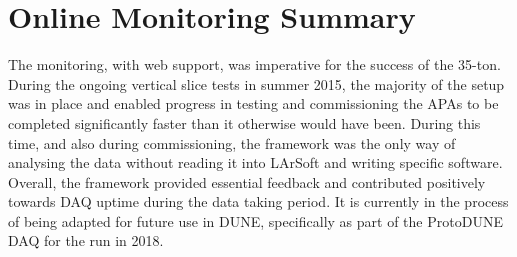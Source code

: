 \section{Online Monitoring Summary}

The monitoring, with web support, was imperative for the success of the 35-ton.  During the ongoing vertical slice tests in summer 2015, the majority of the setup was in place and enabled progress in testing and commissioning the APAs to be completed significantly faster than it otherwise would have been.  During this time, and also during commissioning, the framework was the only way of analysing the data without reading it into LArSoft and writing specific software.  Overall, the framework provided essential feedback and contributed positively towards DAQ uptime during the data taking period.  It is currently in the process of being adapted for future use in DUNE, specifically as part of the ProtoDUNE DAQ for the run in 2018.

